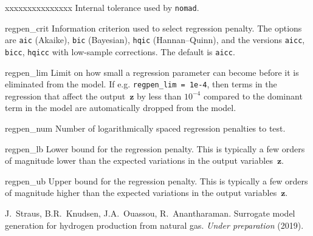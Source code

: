 \documentclass[a4paper,bibliography=numbered]{scrartcl}
\begin{document}
\begin{labeling}{xxxxxxxxxxxxxxx}
		Internal tolerance used by \texttt{nomad}.
	\item[regpen\_crit]
		Information criterion used to select regression penalty.
		The options are \texttt{aic} (Akaike), \texttt{bic} (Bayesian), \texttt{hqic} (Hannan--Quinn), and the versions \texttt{aicc}, \texttt{bicc}, \texttt{hqicc} with low-sample corrections.
		The default is \texttt{aicc}.
	\item[regpen\_lim]
		Limit on how small a regression parameter can become before it is eliminated from the model.
		If e.g. \texttt{regpen\_lim = 1e-4}, then terms in the regression that affect the output~$\bm{z}$ by less than $10^{-4}$ compared to the dominant term in the model are automatically dropped from the model.
	\item[regpen\_num]
		Number of logarithmically spaced regression penalties to test.
	\item[regpen\_lb]
		Lower bound for the regression penalty.
		This is typically a few orders of magnitude lower than the expected variations in the output variables~$\bm{z}$.
	\item[regpen\_ub]
		Upper bound for the regression penalty.
		This is typically a few orders of magnitude higher than the expected variations in the output variables~$\bm{z}$.
\end{labeling}

\begin{thebibliography}{10}
	J.~Straus, B.R.~Knudsen, J.A.~Ouassou, R.~Anantharaman.
	Surrogate model generation for hydrogen production from natural gas.
	\emph{Under preparation} (2019).
\end{thebibliography}
\end{document}
